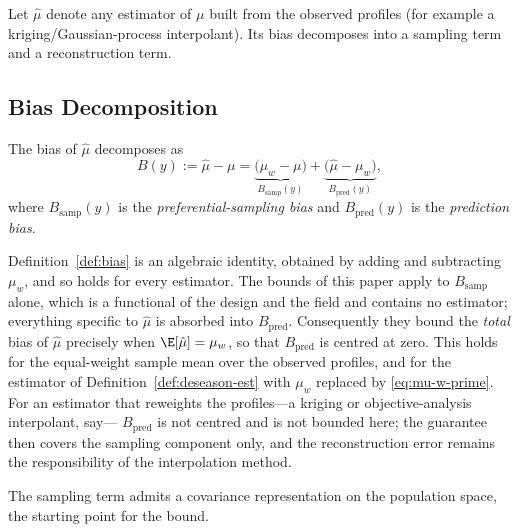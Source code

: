 Let $\hat\mu$ denote any estimator of $\mu$ built from the observed profiles (for example a kriging/Gaussian-process interpolant).
Its bias decomposes into a sampling term and a reconstruction term.

\subsection{Bias Decomposition}
\label{sec:defbias}

\begin{definition}
\label{def:bias}
The bias of $\hat\mu$ decomposes as
\[
  B(y) := \hat\mu - \mu
  = \underbrace{\big(\mu_w - \mu\big)}_{\textstyle B_{\mathrm{samp}}(y)}
  + \underbrace{\big(\hat\mu - \mu_w\big)}_{\textstyle B_{\mathrm{pred}}(y)},
\]
where $B_{\mathrm{samp}}(y)$ is the \emph{preferential-sampling bias}
and $B_{\mathrm{pred}}(y)$ is the \emph{prediction bias}. \end{definition}

\begin{remark}
\label{rem:bias-scope}
Definition~\ref{def:bias} is an algebraic identity, obtained by adding
and subtracting $\mu_w$, and so holds for every estimator. The bounds of
this paper apply to $B_{\mathrm{samp}}$ alone, which is a functional of
the design and the field and contains no estimator; everything specific
to $\hat\mu$ is absorbed into $B_{\mathrm{pred}}$. Consequently they
bound the \emph{total} bias of $\hat\mu$ precisely when
$\E[\hat\mu]=\mu_w$, so that $B_{\mathrm{pred}}$ is centred at zero. This
holds for the equal-weight sample mean over the observed profiles, and
for the estimator of Definition~\ref{def:deseason-est} with $\mu_w$
replaced by \eqref{eq:mu-w-prime}. For an estimator that reweights the
profiles---a kriging or objective-analysis interpolant, say---
$B_{\mathrm{pred}}$ is not centred and is not bounded here; the guarantee
then covers the sampling component only, and the reconstruction error
remains the responsibility of the interpolation method.
\end{remark}

The sampling term admits a covariance representation on the population
space, the starting point for the bound.

